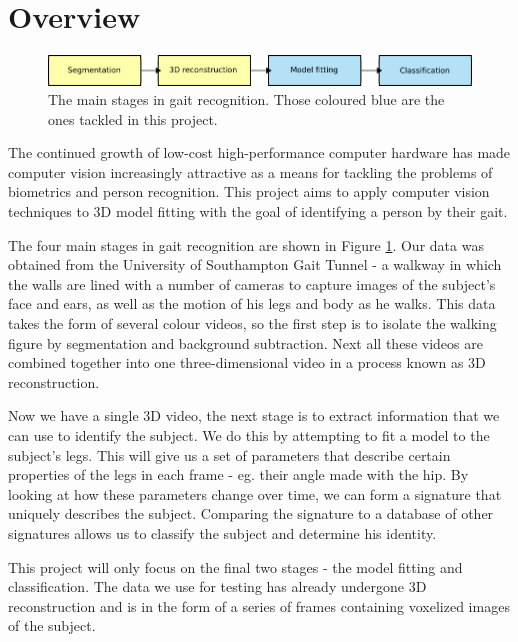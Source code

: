 \section{Overview}

\begin{figure}[b]
	\centering
	\includegraphics[width=12cm]{overview.png}
	\caption{The main stages in gait recognition.
		Those coloured blue are the ones tackled in this project.}
	\label{OverviewBoxes}
\end{figure}

The continued growth of low-cost high-performance computer hardware has made computer vision increasingly attractive as a means for tackling the problems of biometrics and person recognition.
This project aims to apply computer vision techniques to 3D model fitting with the goal of identifying a person by their gait.

The four main stages in gait recognition are shown in Figure \ref{OverviewBoxes}.
Our data was obtained from the University of Southampton Gait Tunnel -
a walkway in which the walls are lined with a number of cameras to capture images of the subject's face and ears, as well as the motion of his legs and body as he walks.
This data takes the form of several colour videos, so the first step is to isolate the walking figure by segmentation and background subtraction.
Next all these videos are combined together into one three-dimensional video in a process known as 3D reconstruction.

Now we have a single 3D video, the next stage is to extract information that we can use to identify the subject.
We do this by attempting to fit a model to the subject's legs.
This will give us a set of parameters that describe certain properties of the legs in each frame - eg. their angle made with the hip.
By looking at how these parameters change over time, we can form a signature that uniquely describes the subject.
Comparing the signature to a database of other signatures allows us to classify the subject and determine his identity.

This project will only focus on the final two stages - the model fitting and classification.
The data we use for testing has already undergone 3D reconstruction and is in the form of a series of frames containing voxelized images of the subject.

